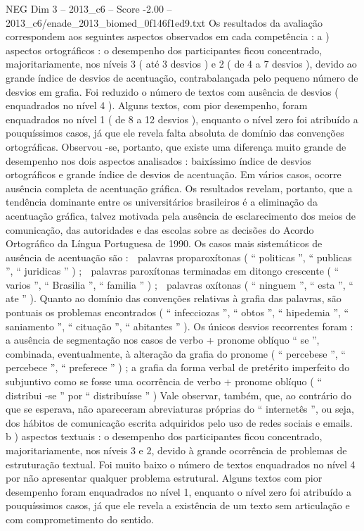 \begin{textsample}{NEG Dim 3 – 2013\_c6 – Score -2.00 – 2013\_c6/enade\_2013\_biomed\_0f146f1ed9.txt}
Os resultados da avaliação correspondem aos seguintes aspectos observados em cada competência : a ) aspectos ortográficos : o desempenho dos participantes ficou concentrado, majoritariamente, nos níveis 3 ( até 3 desvios ) e 2 ( de 4 a 7 desvios ), devido ao grande índice de desvios de acentuação, contrabalançada pelo pequeno número de desvios em grafia.
Foi reduzido o número de textos com ausência de desvios ( enquadrados no nível 4 ).
Alguns textos, com pior desempenho, foram enquadrados no nível 1 ( de 8 a 12 desvios ), enquanto o nível zero foi atribuído a pouquíssimos casos, já que ele revela falta absoluta de domínio das convenções ortográficas.
Observou -se, portanto, que existe uma diferença muito grande de desempenho nos dois aspectos analisados : baixíssimo índice de desvios ortográficos e grande índice de desvios de acentuação.
Em vários casos, ocorre ausência completa de acentuação gráfica.
Os resultados revelam, portanto, que a tendência dominante entre os universitários brasileiros é a eliminação da acentuação gráfica, talvez motivada pela ausência de esclarecimento dos meios de comunicação, das autoridades e das escolas sobre as decisões do Acordo Ortográfico da Língua Portuguesa de 1990.
Os casos mais sistemáticos de ausência de acentuação são :  palavras proparoxítonas ( “ politicas ”, “ publicas ”, “ juridicas ” ) ;  palavras paroxítonas terminadas em ditongo crescente ( “ varios ”, “ Brasilia ”, “ familia ” ) ;  palavras oxítonas ( “ ninguem ”, “ esta ”, “ ate ” ).
Quanto ao domínio das convenções relativas à grafia das palavras, são pontuais os problemas encontrados ( “ infecciozas ”, “ obtos ”, “ hipedemia ”, “ saniamento ”, “ cituação ”, “ abitantes ” ).
Os únicos desvios recorrentes foram : a ausência de segmentação nos casos de verbo + pronome oblíquo “ se ”, combinada, eventualmente, à alteração da grafia do pronome ( “ percebese ”, “ percebece ”, “ preferece ” ) ; a grafia da forma verbal de pretérito imperfeito do subjuntivo como se fosse uma ocorrência de verbo + pronome oblíquo ( “ distribui -se ” por “ distribuísse ” ) Vale observar, também, que, ao contrário do que se esperava, não apareceram abreviaturas próprias do “ internetês ”, ou seja, dos hábitos de comunicação escrita adquiridos pelo uso de redes sociais e emails. b ) aspectos textuais : o desempenho dos participantes ficou concentrado, majoritariamente, nos níveis 3 e 2, devido à grande ocorrência de problemas de estruturação textual.
Foi muito baixo o número de textos enquadrados no nível 4 por não apresentar qualquer problema estrutural.
Alguns textos com pior desempenho foram enquadrados no nível 1, enquanto o nível zero foi atribuído a pouquíssimos casos, já que ele revela a existência de um texto sem articulação e com comprometimento do sentido.

\end{textsample}

